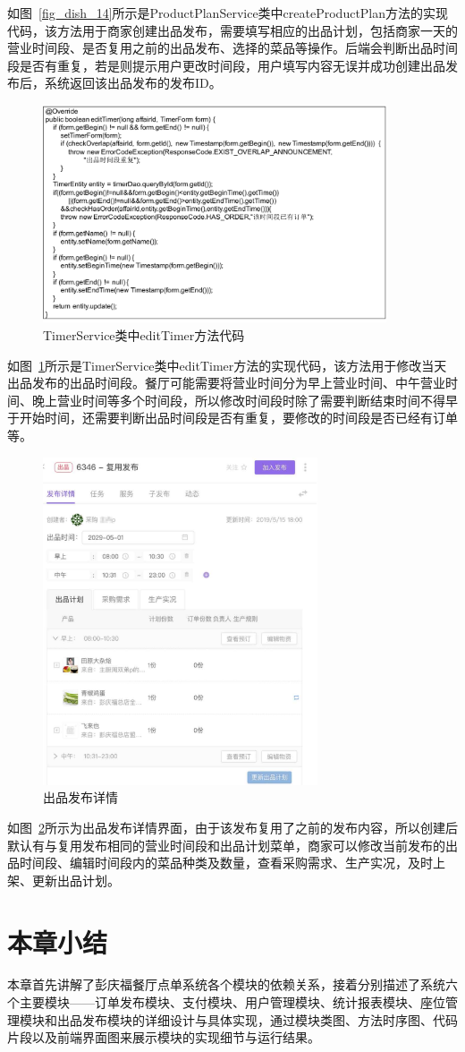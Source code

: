 如图~\ref{fig_dish_14}所示是ProductPlanService类中createProductPlan方法的实现代码，该方法用于商家创建出品发布，需要填写相应的出品计划，包括商家一天的营业时间段、是否复用之前的出品发布、选择的菜品等操作。后端会判断出品时间段是否有重复，若是则提示用户更改时间段，用户填写内容无误并成功创建出品发布后，系统返回该出品发布的发布ID。

\begin{figure}[htbp!]
    \centering
    \includegraphics[width=4in]{FIGs/chapter4/15.pdf}
    \caption{TimerService类中editTimer方法代码}\label{fig_dish_15}
\end{figure}

如图~\ref{fig_dish_15}所示是TimerService类中editTimer方法的实现代码，该方法用于修改当天出品发布的出品时间段。餐厅可能需要将营业时间分为早上营业时间、中午营业时间、晚上营业时间等多个时间段，所以修改时间段时除了需要判断结束时间不得早于开始时间，还需要判断出品时间段是否有重复，要修改的时间段是否已经有订单等。

\begin{figure}[htbp!]
    \centering
    \includegraphics[width=3.2in]{FIGs/chapter4/dish_detail.pdf}
    \caption{出品发布详情}\label{fig_dish_detail}
\end{figure}

如图~\ref{fig_dish_detail}所示为出品发布详情界面，由于该发布复用了之前的发布内容，所以创建后默认有与复用发布相同的营业时间段和出品计划菜单，商家可以修改当前发布的出品时间段、编辑时间段内的菜品种类及数量，查看采购需求、生产实况，及时上架、更新出品计划。

\section{本章小结}
本章首先讲解了彭庆福餐厅点单系统各个模块的依赖关系，接着分别描述了系统六个主要模块——订单发布模块、支付模块、用户管理模块、统计报表模块、座位管理模块和出品发布模块的详细设计与具体实现，通过模块类图、方法时序图、代码片段以及前端界面图来展示模块的实现细节与运行结果。